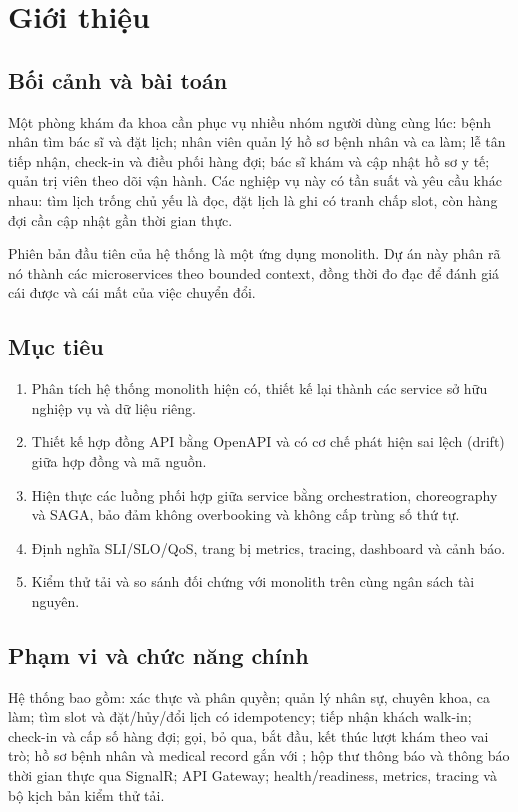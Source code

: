 \section{Giới thiệu}
\label{ch:intro}

\subsection{Bối cảnh và bài toán}

Một phòng khám đa khoa cần phục vụ nhiều nhóm người dùng cùng lúc: bệnh nhân tìm bác sĩ và đặt lịch; nhân viên quản lý hồ sơ bệnh nhân và ca làm; lễ tân tiếp nhận, check-in và điều phối hàng đợi; bác sĩ khám và cập nhật hồ sơ y tế; quản trị viên theo dõi vận hành. Các nghiệp vụ này có tần suất và yêu cầu khác nhau: tìm lịch trống chủ yếu là đọc, đặt lịch là ghi có tranh chấp slot, còn hàng đợi cần cập nhật gần thời gian thực.

Phiên bản đầu tiên của hệ thống là một ứng dụng monolith. Dự án này phân rã nó thành các microservices theo bounded context, đồng thời đo đạc để đánh giá cái được và cái mất của việc chuyển đổi.

\subsection{Mục tiêu}

\begin{enumerate}
  \item Phân tích hệ thống monolith hiện có, thiết kế lại thành các service sở hữu nghiệp vụ và dữ liệu riêng.
  \item Thiết kế hợp đồng API bằng OpenAPI và có cơ chế phát hiện sai lệch (drift) giữa hợp đồng và mã nguồn.
  \item Hiện thực các luồng phối hợp giữa service bằng orchestration, choreography và SAGA, bảo đảm không overbooking và không cấp trùng số thứ tự.
  \item Định nghĩa SLI/SLO/QoS, trang bị metrics, tracing, dashboard và cảnh báo.
  \item Kiểm thử tải và so sánh đối chứng với monolith trên cùng ngân sách tài nguyên.
\end{enumerate}

\subsection{Phạm vi và chức năng chính}

Hệ thống bao gồm: xác thực và phân quyền; quản lý nhân sự, chuyên khoa, ca làm; tìm slot và đặt/hủy/đổi lịch có idempotency; tiếp nhận khách walk-in; check-in và cấp số hàng đợi; gọi, bỏ qua, bắt đầu, kết thúc lượt khám theo vai trò; hồ sơ bệnh nhân và medical record gắn với ; hộp thư thông báo và thông báo thời gian thực qua SignalR; API Gateway; health/readiness, metrics, tracing và bộ kịch bản kiểm thử tải.

